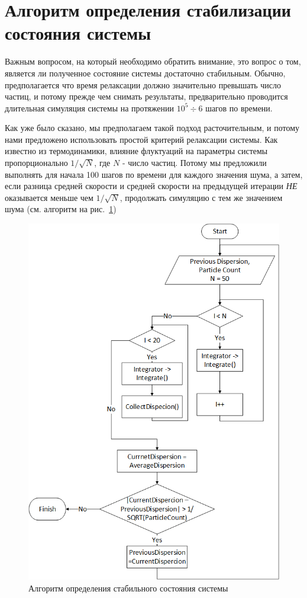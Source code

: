 \section{Алгоритм определения стабилизации состояния системы} %
\label{sec:StabilityAlgorithm}
    Важным вопросом, на который необходимо обратить внимание, это вопрос о том, является ли полученное состояние системы достаточно стабильным. Обычно, предполагается что время релаксации должно значительно превышать число частиц, и потому прежде чем снимать результаты, предварительно проводится длительная симуляция системы на протяжении $10^5 \div 6$ шагов по времени.

    Как уже было сказано, мы предполагаем такой подход расточительным, и потому нами предложено использовать простой критерий релаксации системы. Как известно из термодинамики, влияние флуктуаций на параметры системы пропорционально $1/\sqrt{N}$, где $N$ - число частиц. Потому мы предложили выполнять для начала 100 шагов по времени для каждого значения шума, а затем, если разница средней скорости и средней скорости на предыдущей итерации \textit{НЕ} оказывается меньше чем $1/\sqrt{N}$, продолжать симуляцию с тем же значением шума (см. алгоритм на рис.~\ref{fig:MainAlgorithm})

    \begin{figure}[h]
    \centering
        \includegraphics[width = \textwidth]{Images/MainAlgorithm}
        \caption{Алгоритм определения стабильного состояния системы}
        \label{fig:MainAlgorithm}
    \end{figure}

